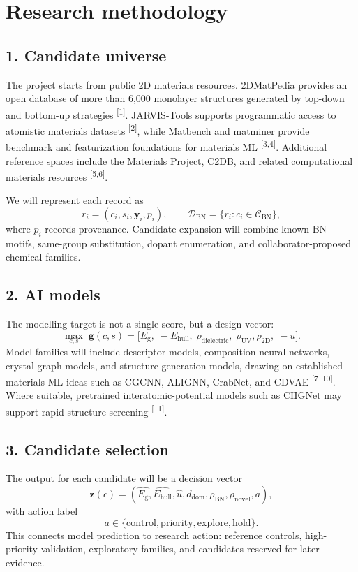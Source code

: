 \documentclass[10pt]{article}
\newcommand{\eg}{E_{\mathrm{g}}}
\newcommand{\ehull}{E_{\mathrm{hull}}}
\newcommand{\unc}{u}
\newcommand{\domain}{d_{\mathrm{dom}}}
\begin{document}
\section*{Research methodology}
\subsection*{1. Candidate universe}
The project starts from public 2D materials resources. 2DMatPedia provides an open database of more than 6,000 monolayer structures generated by top-down and bottom-up strategies \textsuperscript{[1]}. JARVIS-Tools supports programmatic access to atomistic materials datasets \textsuperscript{[2]}, while Matbench and matminer provide benchmark and featurization foundations for materials ML \textsuperscript{[3,4]}. Additional reference spaces include the Materials Project, C2DB, and related computational materials resources \textsuperscript{[5,6]}.

We will represent each record as
\[
  r_i=(c_i,s_i,\mathbf{y}_i,p_i),\qquad
  \mathcal{D}_{\mathrm{BN}}=\{r_i:c_i\in\mathcal{C}_{\mathrm{BN}}\},
\]
where $p_i$ records provenance. Candidate expansion will combine known BN motifs, same-group substitution, dopant enumeration, and collaborator-proposed chemical families.

\subsection*{2. AI models}
The modelling target is not a single score, but a design vector:
\[
  \max_{c,s}\; \mathbf{g}(c,s)=
  \big[\eg,\;-\ehull,\;\rho_{\mathrm{dielectric}},\;\rho_{\mathrm{UV}},
  \rho_{\mathrm{2D}},\;-\unc\big].
\]
Model families will include descriptor models, composition neural networks, crystal graph models, and structure-generation models, drawing on established materials-ML ideas such as CGCNN, ALIGNN, CrabNet, and CDVAE \textsuperscript{[7--10]}. Where suitable, pretrained interatomic-potential models such as CHGNet may support rapid structure screening \textsuperscript{[11]}.

\subsection*{3. Candidate selection}
The output for each candidate will be a decision vector
\[
  \mathbf{z}(c)=
  (\hat{\eg},\hat{\ehull},\hat{\unc},\domain,\rho_{\mathrm{BN}},
  \rho_{\mathrm{novel}},a),
\]
with action label
\[
  a\in\{\mathrm{control},\mathrm{priority},\mathrm{explore},\mathrm{hold}\}.
\]
This connects model prediction to research action: reference controls, high-priority validation, exploratory families, and candidates reserved for later evidence.
\end{document}
